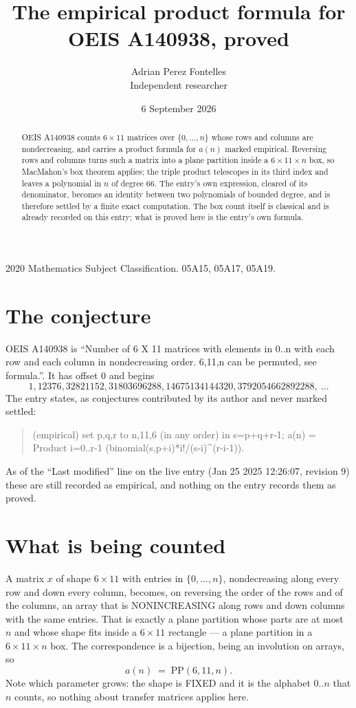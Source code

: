 \documentclass[11pt,a4paper]{article}
\title{The empirical product formula for OEIS A140938, proved}
\author{Adrian Perez Fontelles\\ \small Independent researcher}
\date{6 September 2026}
\theoremstyle{plain}
\theoremstyle{definition}
\begin{document}
\maketitle

\begin{abstract}
OEIS A140938 counts $6\times11$ matrices over $\{0,\dots,n\}$ whose rows and columns are
nondecreasing, and carries a product formula for $a(n)$ marked empirical. Reversing rows and
columns turns such a matrix into a plane partition inside a $6\times11\times n$ box, so
MacMahon's box theorem applies; the triple product telescopes in its third index and leaves a
polynomial in $n$ of degree $66$. The entry's own expression, cleared of its denominator,
becomes an identity between two polynomials of bounded degree, and is therefore settled by a
finite exact computation. The box count itself is classical and is already recorded on this
entry; what is proved here is the entry's own formula.
\end{abstract}

\noindent\small 2020 Mathematics Subject Classification. 05A15, 05A17, 05A19.\normalsize

\section{The conjecture}

OEIS A140938 is ``Number of 6 X 11 matrices with elements in 0..n with each row and each column in nondecreasing order. 6,11,n can be permuted, see formula.''. It has offset $0$ and begins
\[
1, 12376, 32821152, 31803696288, 14675134144320, 3792054662892288,\ \dots
\]
The entry states, as conjectures contributed by its author and never marked settled:
\begin{quote}
(empirical) set p,q,r to n,11,6 (in any order) in s=p+q+r-1; a(n) = Product {i=0..r-1} (binomial(s,p+i)*i!/(s-i)\^{}(r-i-1)).

\end{quote}
As of the ``Last modified'' line on the live entry (Jan 25 2025 12:26:07, revision 9) these are still
recorded as empirical, and nothing on the entry records them as proved.

\section{What is being counted}

A matrix $x$ of shape $6\times11$ with entries in $\{0,\dots,n\}$, nondecreasing along
every row and down every column, becomes, on reversing the order of the rows and of the
columns, an array that is NONINCREASING along rows and down columns with the same entries. That
is exactly a plane partition whose parts are at most $n$ and whose shape fits inside a
$6\times11$ rectangle --- a plane partition in a $6\times11\times n$ box. The
correspondence is a bijection, being an involution on arrays, so
\[
a(n)\;=\;\mathrm{PP}(6,11,n).
\]
Note which parameter grows: the shape is FIXED and it is the alphabet $0..n$ that $n$ counts,
so nothing about transfer matrices applies here.
\end{document}

